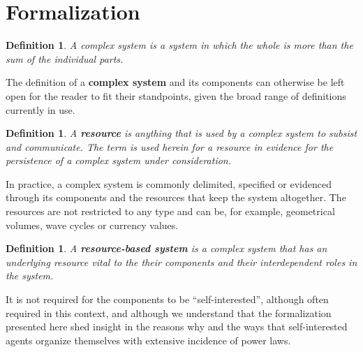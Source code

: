\documentclass[a4paper, 11pt]{article} %
\newtheorem{definition2}[theorem3]{Definition}
\begin{document}
\section{Formalization}\label{sec:form}

\begin{definition2}
A complex system is a system in which the whole is more
than the sum of the individual parts.
\end{definition2}

The definition of a {\bf complex system} and its components 
can otherwise be left open
for the reader to fit their standpoints,
given the broad range of definitions currently in use.

\begin{definition2}
	A {\bf resource} is anything that is used by a complex system to subsist and communicate. The term is used herein for a resource in evidence for the persistence of a complex system under consideration.
\end{definition2}

In practice, a complex system is commonly delimited, specified or evidenced through its components and the resources that keep the system altogether.
The resources are not restricted to any type
and can be, for example, geometrical volumes,
wave cycles or currency values.

\begin{definition2}
	A {\bf resource-based system} is a complex system that has an underlying resource vital to the their components and their interdependent roles in the system.
\end{definition2}


It is not required for the components to be ``self-interested'',
although often required in this context, and although
we understand that the formalization presented here shed insight
in the reasons why and the ways that self-interested agents
organize themselves with extensive incidence of power laws.
\end{document}
